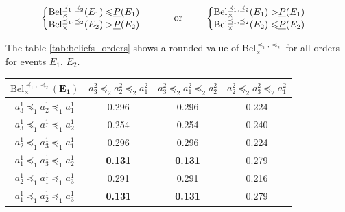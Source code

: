 \begin{example}
 \begin{align*}
    \begin{cases}
        \begin{split}
            \mathrm{Bel}_\times^{\preceq_1,\preceq_2}(E_1) \leqslant& {\underline{P}}(E_1)\\
            \mathrm{Bel}_\times^{\preceq_1,\preceq_2}(E_2) >& {\underline{P}}(E_2)
        \end{split}
    \end{cases}
    \qquad\text{ or }\qquad
    \begin{cases}
        \begin{split}
            \mathrm{Bel}_\times^{\preceq_1,\preceq_2}(E_1) >& {\underline{P}}(E_1)\\
            \mathrm{Bel}_\times^{\preceq_1,\preceq_2}(E_2) \leqslant& {\underline{P}}(E_2)
        \end{split}
    \end{cases}
\end{align*}

The table \ref{tab:beliefs_orders} shows a rounded value of $\mathrm{Bel}^{\preceq_1,\preceq_2}_\times$ for all orders for events $E_1$, $E_2$.

\begin{table}[!ht]
\centering
\begin{tabular}{|c||c|c|c|}
\hline
$\mathrm{Bel}^{\preceq_1,\preceq_2}_\times(\mathbf{E_1})$ & $a^2_3\preceq_2a^2_2\preceq_2a^2_1$ & $a^2_3\preceq_2a^2_1\preceq_2a^2_2$ & $a^2_2\preceq_2a^2_3\preceq_2a^2_1$ \\ \hline\hline
$a^1_3\preceq_1a^1_2\preceq_1a^1_1$ & 0.296 & 0.296 & 0.224 \\ \hline
$a^1_3\preceq_1a^1_1\preceq_1a^1_2$ & 0.254 & 0.254 & 0.240 \\ \hline
$a^1_2\preceq_1a^1_3\preceq_1a^1_1$ & 0.296 & 0.296 & 0.224 \\ \hline
$a^1_1\preceq_1a^1_3\preceq_1a^1_2$ & \textbf{0.131} & \textbf{0.131} & 0.279 \\ \hline
$a^1_2\preceq_1a^1_1\preceq_1a^1_3$ & 0.291 & 0.291 & 0.216 \\ \hline
$a^1_1\preceq_1a^1_2\preceq_1a^1_3$ & \textbf{0.131} & \textbf{0.131} & 0.279 \\ \hline
\end{tabular}

\vspace{0.5cm}


\end{table}
\end{example}
